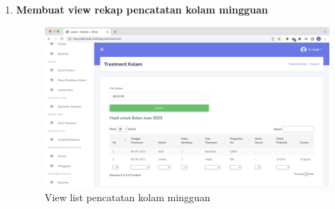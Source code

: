 \begin{enumerate}[1.]
\item \textbf{Membuat view rekap pencatatan kolam mingguan}
\begin{figure}[H]
	\centering
	\includegraphics[width=1\textwidth]{gambar/Sprint10/view/view_rekap_treatment_kolam}
	\caption{View list pencatatan kolam mingguan}
	\label{fig:view_list_pencatatan_kolam_mingguan}
\end{figure}




\end{enumerate}